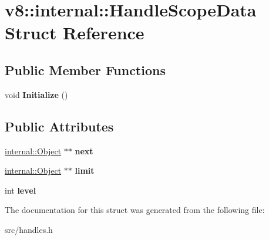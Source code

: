 \hypertarget{structv8_1_1internal_1_1_handle_scope_data}{}\section{v8\+:\+:internal\+:\+:Handle\+Scope\+Data Struct Reference}
\label{structv8_1_1internal_1_1_handle_scope_data}
\subsection*{Public Member Functions}
\begin{DoxyCompactItemize}
\item 
\hypertarget{structv8_1_1internal_1_1_handle_scope_data_aea891abe1d0d28f81e9fda6601e6e89b}{}void {\bfseries Initialize} ()\label{structv8_1_1internal_1_1_handle_scope_data_aea891abe1d0d28f81e9fda6601e6e89b}

\end{DoxyCompactItemize}
\subsection*{Public Attributes}
\begin{DoxyCompactItemize}
\item 
\hypertarget{structv8_1_1internal_1_1_handle_scope_data_a93aac6e8452bb513a4c3b48fe7c6d85b}{}\hyperlink{classv8_1_1internal_1_1_object}{internal\+::\+Object} $\ast$$\ast$ {\bfseries next}\label{structv8_1_1internal_1_1_handle_scope_data_a93aac6e8452bb513a4c3b48fe7c6d85b}

\item 
\hypertarget{structv8_1_1internal_1_1_handle_scope_data_a9d7a758c3c0bb723092b1bcfba7f17b7}{}\hyperlink{classv8_1_1internal_1_1_object}{internal\+::\+Object} $\ast$$\ast$ {\bfseries limit}\label{structv8_1_1internal_1_1_handle_scope_data_a9d7a758c3c0bb723092b1bcfba7f17b7}

\item 
\hypertarget{structv8_1_1internal_1_1_handle_scope_data_a3a33780c9478043e290d0e878ab5d485}{}int {\bfseries level}\label{structv8_1_1internal_1_1_handle_scope_data_a3a33780c9478043e290d0e878ab5d485}

\end{DoxyCompactItemize}


The documentation for this struct was generated from the following file\+:\begin{DoxyCompactItemize}
\item 
src/handles.\+h\end{DoxyCompactItemize}
